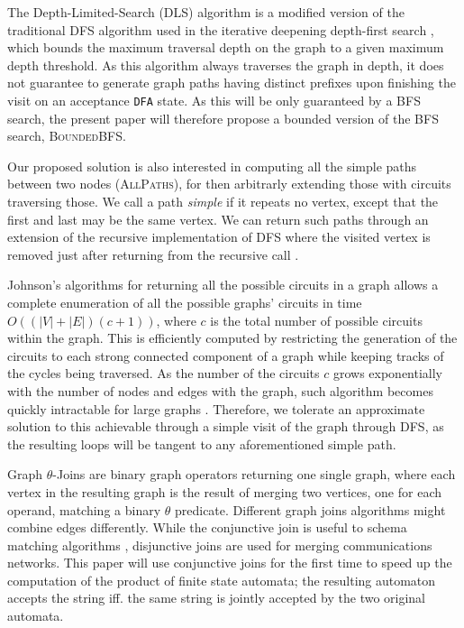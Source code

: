 \documentclass[sigconf]{acmart}
\begin{document}
The Depth-Limited-Search (DLS) algorithm is a modified version of the traditional DFS algorithm used in the iterative deepening depth-first search \cite{DBLP:journals/ai/Korf85}, which  bounds the maximum traversal depth on the graph to a given maximum depth threshold. As this algorithm always traverses the graph in depth, it does not guarantee to generate graph paths having distinct prefixes upon finishing the visit on an acceptance \texttt{DFA} state. As this will be only guaranteed by a BFS search, the present paper will therefore propose a bounded version of the BFS search, \textsc{BoundedBFS}.

Our proposed solution is also interested in computing all the simple paths between two nodes (\textsc{AllPaths}), for then arbitrarly extending those with circuits traversing those. We call a path \textit{simple} if it repeats no vertex, except that the first and last may be the same vertex. We can return such paths through an extension of the recursive implementation of DFS where the visited vertex is removed just after returning from the recursive call \cite{ASPNIST}. 


Johnson's algorithms for returning all the possible circuits in a graph \cite{doi:10.1137/0204007} allows a complete enumeration of all the possible graphs' circuits in time $O((|V|+|E|)(c+1))$, where $c$ is the total number of possible circuits within the graph. This is efficiently computed by restricting the generation of the circuits to each strong connected component of a graph while keeping tracks of the cycles being traversed. As the number of the circuits $c$ grows exponentially with the number of nodes and edges with the graph, such algorithm becomes quickly intractable for large graphs \cite{DBLP:conf/fcs/HawickJ08}. Therefore, we tolerate an approximate solution to this achievable through a simple visit of the graph through DFS, as the resulting loops will be tangent to any aforementioned simple path. 

Graph $\theta$-Joins \cite{DBLP:conf/ideas/Bergami21} are binary graph  operators returning one single graph, where each vertex in the resulting graph is the result of merging two vertices, one for each operand, matching a binary $\theta$ predicate. Different graph joins algorithms might combine edges differently. While the conjunctive join is useful to schema matching algorithms \cite{DBLP:books/sp/Melnik04}, disjunctive joins are used for merging communications networks. This paper will use conjunctive joins for the first time to speed up the computation of the product of finite state automata; the resulting automaton accepts the string iff. the same string is jointly accepted by the two original automata. %
\end{document}
